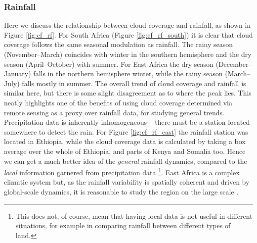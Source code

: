 \subsubsection{Rainfall}
\label{sec:disc:rain}
Here we discuss the relationship between cloud coverage and rainfall,
as shown in Figure \ref{fig:cf_rf}. For South Africa (Figure
\ref{fig:cf_rf_south}) it is clear that cloud coverage follows the
same seasonal modulation as rainfall. The rainy season
(November--March) coincides with winter in the southern hemisphere and
the dry season (April--October) with summer. For East Africa the dry
season (December--January) falls in the northern hemisphere winter,
while the rainy season (March--July) falls mostly in summer. The
overall trend of cloud coverage and rainfall is similar here, but
there is some slight disagreement as to where the peak lies. This
neatly highlights one of the benefits of using cloud coverage
determined via remote sensing as a proxy over rainfall data, for
studying general trends. Precipitation data is inherently
inhomogeneous -- there must be a station located somewhere to detect
the rain. For Figure \ref{fig:cf_rf_east} the rainfall station was
located in Ethiopia, while the cloud coverage data is calculated by
taking a box average over the whole of Ethiopia, and parts of Kenya
and Somalia too. Hence we can get a much better idea of the
\emph{general} rainfall dynamics, compared to the \emph{local}
information garnered from precipitation data \footnote{This does not,
  of course, mean that having local data is not useful in different
  situations, for example in comparing rainfall between different
  types of land.}. East Africa is a complex climatic system but, as
the rainfall variability is spatially coherent and driven by
global-scale dynamics, it is reasonable to study the region on the
large scale \citep{nicholson1996b}.
  


